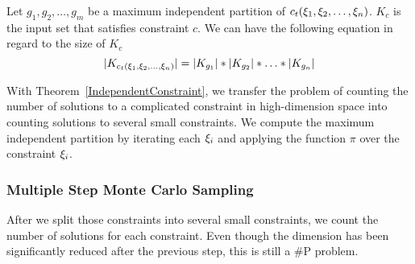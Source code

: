 \begin{theorem}
      \label{IndependentConstraint}
      Let $g_{1}, g_{2}, \ldots, g_{m}$ be a maximum independent partition of
      $c_t({\xi}_{1},{\xi}_{2},\ldots,{\xi}_{n})$.
      $K_c$ is the input set that satisfies constraint $c$. We can have the following
      equation in regard to the size of $K_c$
      $$|K_{c_t({\xi}_{1},{\xi}_{2},\ldots,{\xi}_{n})}| = |K_{g_{1}}|*|K_{g_{2}}|*\ldots*|K_{g_{n}}|$$
\end{theorem}
\vspace{-3pt}
With Theorem~\ref{IndependentConstraint}, we transfer the problem of
counting the number of solutions to a complicated constraint in high-dimension
space into counting solutions to several small constraints. We compute the
maximum independent partition by iterating each ${\xi}_{i}$ and applying the function
$\pi$ over the constraint ${\xi}_{i}$.



\subsubsection{Multiple Step Monte Carlo Sampling}

After we split those constraints into several small constraints, we count the
number of solutions for each constraint. Even though the dimension has been
significantly reduced after the previous step, this is still a \#P problem. 

